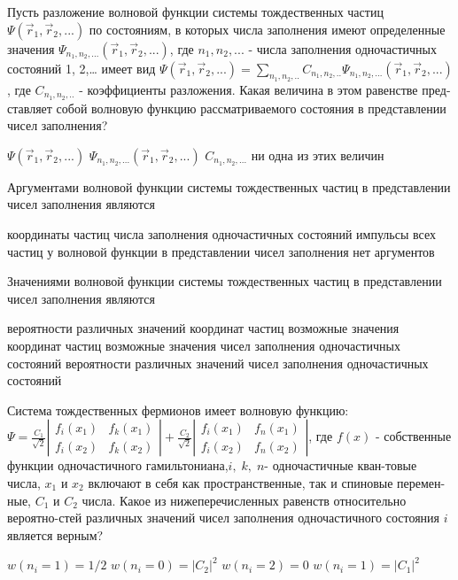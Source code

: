 \documentclass[11pt,a4paper]{exam}
\begin{document}
\begin{questions}
\question Пусть разложение волновой функции системы тождественных частиц $\Psi ({\vec r_1},{\vec r_2},...)$ по состояниям, в которых числа заполнения имеют определенные значения ${\Psi _{{n_1},{n_2},...}}({\vec r_1},{\vec r_2},...)$, где ${n_1},{n_2},...$ - числа заполнения одночастичных состояний 1, 2,…  имеет вид
$\Psi ({\vec r_1},{\vec r_2},...) = \sum\limits_{{n_1},{n_2},..} {{C_{{n_1},{n_2},..}}{\Psi _{{n_1},{n_2},...}}({{\vec r}_1},{{\vec r}_2},...)} $,
где ${C_{{n_1},{n_2},..}}$ - коэффициенты разложения. Какая величина в этом равенстве пред-ставляет собой волновую функцию рассматриваемого состояния в представлении чисел заполнения?
\begin{choices}
\choice $\Psi ({\vec r_1},{\vec r_2},...)$     
\choice ${\Psi _{{n_1},{n_2},...}}({\vec r_1},{\vec r_2},...)$      
\choice ${C_{{n_1},{n_2},...}}$ 
\choice ни одна из этих величин
\end{choices}

\question Аргументами волновой функции системы тождественных частиц в представлении чисел заполнения являются
\begin{choices}
\choice координаты частиц
\choice числа заполнения одночастичных состояний 
\choice импульсы всех частиц
\choice у волновой функции в представлении чисел заполнения нет аргументов
\end{choices}

\question Значениями волновой функции системы тождественных частиц в представлении чисел заполнения являются
\begin{choices}
\choice вероятности различных значений координат частиц
\choice возможные значения координат частиц
\choice возможные значения чисел заполнения одночастичных состояний
\choice вероятности различных значений чисел заполнения одночастичных состояний 
\end{choices}

\question Система тождественных фермионов имеет волновую функцию:
$\Psi  = \frac{{{C_1}}}{{\sqrt 2 }}\left| {\begin{array}{*{20}{c}}
{{f_i}({x_1})}&{{f_k}({x_1})}\\
{{f_i}({x_2})}&{{f_k}({x_2})}
\end{array}} \right| + \frac{{{C_2}}}{{\sqrt 2 }}\left| {\begin{array}{*{20}{c}}
{{f_i}({x_1})}&{{f_n}({x_1})}\\
{{f_i}({x_2})}&{{f_n}({x_2})}
\end{array}} \right|$, 
где $f(x)$ - собственные функции одночастичного гамильтониана,$i,\;k,\;n$- одночастичные кван-товые числа, ${x_1}$ и ${x_2}$ включают в себя как пространственные, так и спиновые перемен-ные, ${C_1}$ и ${C_2}$ числа. Какое из нижеперечисленных равенств относительно вероятно-стей различных значений чисел заполнения одночастичного состояния $i$ является верным?
\begin{choices}
\choice $w({n_i} = 1) = 1/2$ 
\choice $w({n_i} = 0) = {\left| {{C_2}} \right|^2}$  
\choice $w({n_i} = 2) = 0$   
\choice $w({n_i} = 1) = {\left| {{C_1}} \right|^2}$
\end{choices}


\end{questions}
\end{document}

